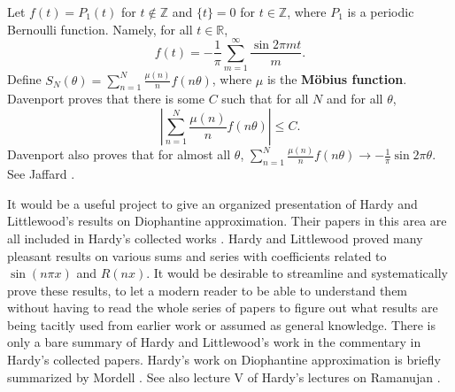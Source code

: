 \documentclass{amsart}
\begin{document}
Let $f(t)=P_1(t)$ for $t \not \in \mathbb{Z}$ and $\{t\}=0$ for $t \in \mathbb{Z}$, where $P_1$ is a periodic
Bernoulli function. Namely, for all $t \in \mathbb{R}$,
\[
f(t) = - \frac{1}{\pi} \sum_{m=1}^\infty \frac{\sin 2\pi mt}{m}.
\]
Define $S_N(\theta) = \sum_{n=1}^N \frac{\mu(n)}{n} f(n\theta)$, where
$\mu$ is the \textbf{M\"obius function}. 
Davenport \cite[p.~11, Theorem 2]{davenport1937} proves that there is some $C$ such that for all $N$ 
and for all $\theta$,
\[
\left| \sum_{n=1}^N \frac{\mu(n)}{n} f(n\theta) \right| \leq C.
\]
Davenport \cite[p.~13, Theorem 4]{davenport1937}  also proves that for almost all $\theta$, 
$\sum_{n=1}^N \frac{\mu(n)}{n} f(n\theta) \to -\frac{1}{\pi} \sin 2\pi \theta$. See Jaffard \cite{jaffard}.




It would be a useful project to give an organized presentation of Hardy and Littlewood's results on Diophantine approximation. Their papers in this area are all
included in Hardy's collected works \cite{collectedpapers}. Hardy and Littlewood proved many pleasant results on various sums and series with coefficients related
to $\sin(n \pi x)$ and $R(nx)$. It would be desirable to streamline and systematically prove these results, to let a modern reader to be able to understand them without having to 
read the whole series of papers to figure out what results are being tacitly used from earlier work or assumed as general knowledge.
There is only a bare summary of Hardy and Littlewood's work in the commentary in Hardy's collected papers. Hardy's work on Diophantine approximation is briefly summarized by
Mordell \cite{mordell}. See also lecture V of Hardy's lectures on Ramanujan \cite{ramanujan}.



\end{document}
